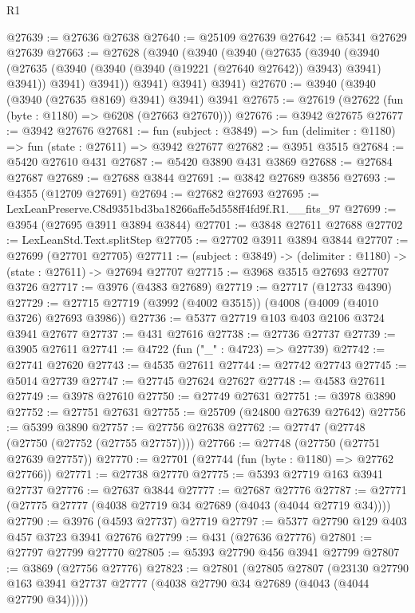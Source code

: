 \begin{lexlean}{R1}
\begin{coremodule}
@27639 := @27636 @27638
@27640 := @25109 @27639
@27642 := @5341 @27629 @27639
@27663 := @27628
    (@3940
      (@3940
        (@3940
          (@27635
            (@3940
              (@3940
                (@27635 (@3940 (@3940 (@3940 (@19221 (@27640 @27642)) @3943) @3941) @3941))
                @3941)
              @3941))
          @3941)
        @3941)
      @3941)
@27670 := @3940 (@3940 (@3940 (@27635 @8169) @3941) @3941) @3941
@27675 := @27619 (@27622 (fun (byte : @1180) => @6208 (@27663 @27670)))
@27676 := @3942 @27675
@27677 := @3942 @27676
@27681 := fun (subject : @3849) => fun (delimiter : @1180) => fun (state : @27611) => @3942 @27677
@27682 := @3951 @3515
@27684 := @5420 @27610 @431
@27687 := @5420 @3890 @431 @3869
@27688 := @27684 @27687
@27689 := @27688 @3844
@27691 := @3842 @27689 @3856
@27693 := @4355 (@12709 @27691)
@27694 := @27682 @27693
@27695 := LexLeanPreserve.C8d9351bd3ba18266affe5d558ff4fd9f.R1.__fits_97
@27699 := @3954 (@27695 @3911 @3894 @3844)
@27701 := @3848 @27611 @27688
@27702 := LexLeanStd.Text.splitStep
@27705 := @27702 @3911 @3894 @3844
@27707 := @27699 (@27701 @27705)
@27711 := (subject : @3849) -> (delimiter : @1180) -> (state : @27611) -> @27694 @27707
@27715 := @3968 @3515 @27693 @27707 @3726
@27717 := @3976 (@4383 @27689)
@27719 := @27717 (@12733 @4390)
@27729 := @27715 @27719 (@3992 (@4002 @3515)) (@4008 (@4009 (@4010 @3726) @27693 @3986))
@27736 := @5377 @27719 @103 @403 @2106 @3724 @3941 @27677
@27737 := @431 @27616
@27738 := @27736 @27737
@27739 := @3905 @27611
@27741 := @4722 (fun ("_" : @4723) => @27739)
@27742 := @27741 @27620
@27743 := @4535 @27611
@27744 := @27742 @27743
@27745 := @5014 @27739
@27747 := @27745 @27624 @27627
@27748 := @4583 @27611
@27749 := @3978 @27610
@27750 := @27749 @27631
@27751 := @3978 @3890
@27752 := @27751 @27631
@27755 := @25709 (@24800 @27639 @27642)
@27756 := @5399 @3890
@27757 := @27756 @27638
@27762 := @27747 (@27748 (@27750 (@27752 (@27755 @27757))))
@27766 := @27748 (@27750 (@27751 @27639 @27757))
@27770 := @27701 (@27744 (fun (byte : @1180) => @27762 @27766))
@27771 := @27738 @27770
@27775 := @5393 @27719 @163 @3941 @27737
@27776 := @27637 @3844
@27777 := @27687 @27776
@27787 := @27771 (@27775 @27777 (@4038 @27719 @34 @27689 (@4043 (@4044 @27719 @34))))
@27790 := @3976 (@4593 @27737) @27719
@27797 := @5377 @27790 @129 @403 @457 @3723 @3941 @27676
@27799 := @431 (@27636 @27776)
@27801 := @27797 @27799 @27770
@27805 := @5393 @27790 @456 @3941 @27799
@27807 := @3869 (@27756 @27776)
@27823 := @27801
    (@27805
      @27807
      (@23130 @27790 @163 @3941 @27737 @27777 (@4038 @27790 @34 @27689 (@4043 (@4044 @27790 @34)))))

\end{coremodule}
\end{lexlean}
